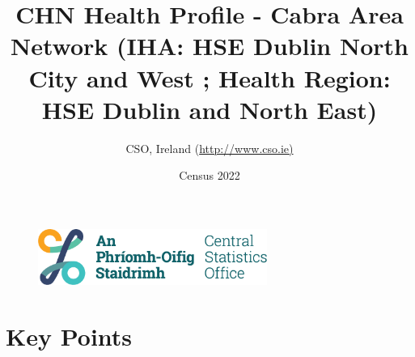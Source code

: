 \documentclass{article}
\title{CHN Health Profile - Cabra Area Network (IHA: HSE Dublin North City and West ;  Health Region: HSE Dublin and North East) }
\date{Census 2022}
\author{CSO, Ireland  (\url{http://www.cso.ie)}}
\begin{document}


\begin{figure}
	\centering
\includegraphics[width =75mm]{../figures/CSO_Logo.png}
\end{figure}

				 
		   
						  
														  
																																													
												 
			 
\maketitle
					
													   
				 
						 
																																																																											   
				 
				  
  \pagebreak
    	    \tableofcontents

\pagebreak


\section{Key Points}
\end{document}
